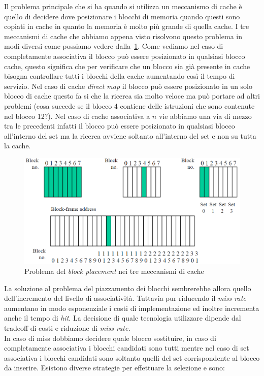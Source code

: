 Il problema principale che si ha quando si utilizza un meccanismo di cache è quello di decidere dove posizionare i blocchi di memoria quando questi sono copiati in cache in quanto la memoria è molto più grande di quella cache. I tre meccanismi di cache che abbiamo appena visto risolvono questo problema in modi diversi come possiamo vedere dalla 	\figurename\,\ref{fig:tipicache}. Come vediamo nel caso di completamente associativa il blocco può essere posizionato in qualsiasi blocco cache, questo significa che per verificare che un blocco sia già presente in cache bisogna controllare tutti i blocchi della cache aumentando così il tempo di servizio. Nel caso di cache \emph{direct map} il blocco può essere posizionato in un solo blocco di cache questo fa si che la ricerca sia molto veloce ma può portare ad altri problemi (cosa succede se il blocco 4 contiene delle istruzioni che sono contenute nel blocco 12?). Nel caso di cache associativa a $n$ vie abbiamo una via di mezzo tra le precedenti infatti il blocco può essere posizionato in qualsiasi blocco all'interno del set ma la ricerca avviene soltanto all'interno del set e non su tutta la cache.
\begin{figure}[htb]
\centering
\includegraphics[scale=0.5]{img/tipicache.png}
\caption{Problema del \emph{block placement} nei tre meccanismi di cache}\label{fig:tipicache}
\end{figure}
La soluzione al problema del piazzamento dei blocchi sembrerebbe allora quello dell'incremento del livello di associatività. Tuttavia pur riducendo il \emph{miss rate} aumentano in modo esponenziale i costi di implementazione ed inoltre incrementa anche il tempo di \emph{hit}. La decisione di quale tecnologia utilizzare dipende dal tradeoff di costi e riduzione di \emph{miss rate.}\\
In caso di miss dobbiamo decidere quale blocco sostituire, in caso di completamente associativa i blocchi candidati sono tutti mentre nel caso di set associativa i blocchi candidati sono soltanto quelli del set corrispondente al blocco da inserire. Esistono diverse strategie per effettuare la selezione e sono:
